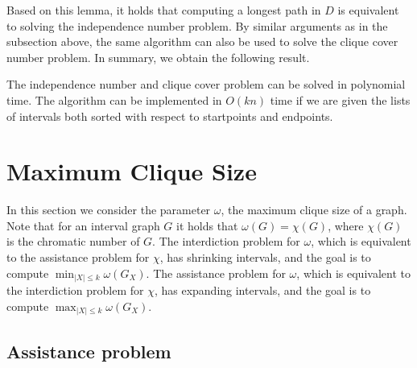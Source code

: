 Based on this lemma, it holds that computing a longest path in $D$ is 
equivalent to solving the independence number  problem. By similar 
arguments as in the subsection above, the same algorithm can also be used to 
solve the clique cover number  problem.
In summary, we obtain the following result.

\begin{theorem}
    The independence number  and clique cover  problem  can 
    be solved in polynomial time.
    The algorithm can be implemented in $O(kn)$ time if we are given the lists of 
    intervals both sorted with respect to startpoints and endpoints.
\end{theorem}

\section{Maximum Clique Size}
In this section we consider the parameter $\omega$,
the maximum clique size of a graph. Note that for an interval graph $G$ it holds
that $\omega(G) = \chi(G)$, where $\chi(G)$ is the chromatic number of $G$.
The interdiction problem for $\omega$, which is equivalent to the assistance problem 
for $\chi$, has shrinking intervals, 
and the goal is to compute $\min_{|X| \leq k} \omega(G_X)$. 
The assistance problem for $\omega$, which is equivalent to the interdiction problem for $\chi$,
has expanding intervals, and the goal is to compute $\max_{|X| \leq k} \omega(G_X)$.

\subsection{Assistance problem}

